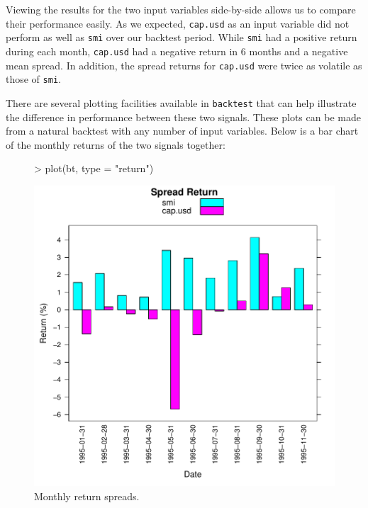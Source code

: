 \documentclass[a4paper]{report}
\begin{document}
\begin{article}
Viewing the results for the two input variables side-by-side allows us
to compare their performance easily.  As we expected, \texttt{cap.usd}
as an input variable did not perform as well as \texttt{smi} over our
backtest period.  While \texttt{smi} had a positive return during each
month, \texttt{cap.usd} had a negative return in 6 months and a
negative mean spread.  In addition, the spread returns for
\texttt{cap.usd} were twice as volatile as those of \texttt{smi}.

There are several plotting facilities available in \texttt{backtest}
that can help illustrate the difference in performance between these
two signals.  These plots can be made from a natural backtest with any
number of input variables.  Below is a bar chart of the monthly
returns of the two signals together:

\begin{figure}
\centering
\vspace*{.1in}
\begin{Schunk}
\begin{Sinput}
> plot(bt, type = "return")
\end{Sinput}
\end{Schunk}
\includegraphics{backtest-020}
\caption{\label{figure:return}
Monthly return spreads.}
\end{figure}


\end{article}
\end{document}
